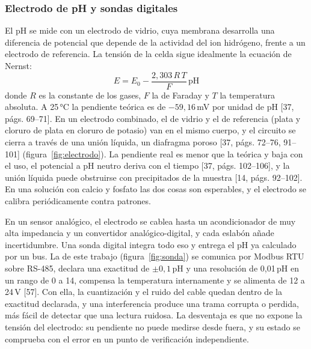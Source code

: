 \subsubsection{Electrodo de pH y sondas digitales}\label{sec:electrodo}
El pH se mide con un electrodo de vidrio, cuya membrana desarrolla una diferencia de potencial que depende de la actividad del ion hidrógeno, frente a un electrodo de referencia. La tensión de la celda sigue idealmente la ecuación de Nernst:
\begin{equation}
E=E_0-\frac{2{,}303\,R\,T}{F}\,\mathrm{pH}\label{eq:nernst}
\end{equation}
donde $R$ es la constante de los gases, $F$ la de Faraday y $T$ la temperatura absoluta. A 25\,°C la pendiente teórica es de $-59{,}16$\,mV por unidad de pH [37, págs. 69–71]. En un electrodo combinado, el de vidrio y el de referencia (plata y cloruro de plata en cloruro de potasio) van en el mismo cuerpo, y el circuito se cierra a través de una unión líquida, un diafragma poroso [37, págs. 72–76, 91–101] (figura~\ref{fig:electrodo}). La pendiente real es menor que la teórica y baja con el uso, el potencial a pH neutro deriva con el tiempo [37, págs. 102–106], y la unión líquida puede obstruirse con precipitados de la muestra [14, págs. 92–102]. En una solución con calcio y fosfato las dos cosas son esperables, y el electrodo se calibra periódicamente contra patrones.


En un sensor analógico, el electrodo se cablea hasta un acondicionador de muy alta impedancia y un convertidor analógico-digital, y cada eslabón añade incertidumbre. Una sonda digital integra todo eso y entrega el pH ya calculado por un bus. La de este trabajo (figura~\ref{fig:sonda}) se comunica por Modbus RTU sobre RS-485, declara una exactitud de $\pm0{,}1$\,pH y una resolución de 0,01\,pH en un rango de 0 a 14, compensa la temperatura internamente y se alimenta de 12 a 24\,V [57]. Con ella, la cuantización y el ruido del cable quedan dentro de la exactitud declarada, y una interferencia produce una trama corrupta o perdida, más fácil de detectar que una lectura ruidosa. La desventaja es que no expone la tensión del electrodo: su pendiente no puede medirse desde fuera, y su estado se comprueba con el error en un punto de verificación independiente.

